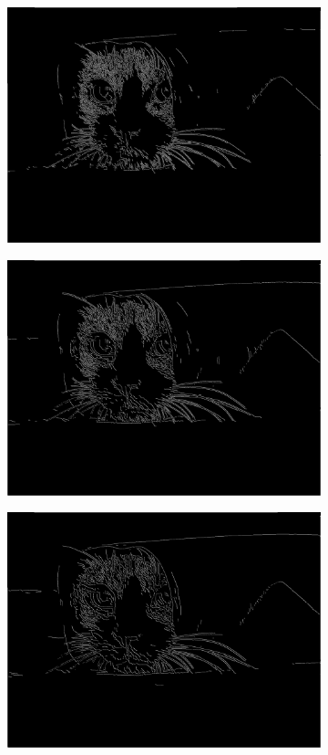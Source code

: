 \documentclass[a4paper]{article}
\begin{document}
\begin{figure}[h]
\begin{subfigure}{0.33\textwidth}
\includegraphics[width=\textwidth]{img/sigma1/cathys.png}
\end{subfigure}
\begin{subfigure}{0.33\textwidth}
\includegraphics[width=\textwidth]{img/sigma2/cathys.png}
\end{subfigure}
\begin{subfigure}{0.33\textwidth}
\includegraphics[width=\textwidth]{img/sigma3/cathys.png}

\end{subfigure}
\end{figure}
\end{document}
